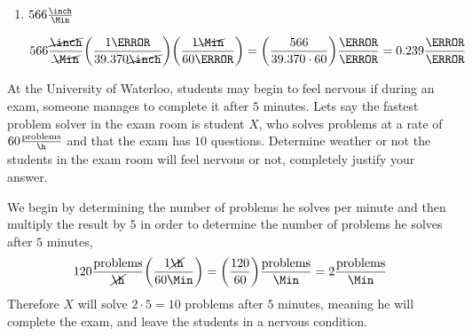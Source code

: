 \documentclass[11pt]{article} %
\begin{document}
\begin{qstn}[1]
\begin{enumerate}
\begin{soln}
 \end{soln}





 \item $566 \frac{\inch}{\Min}$


\begin{soln}
$$ 566 \frac{\cancel{\inch}}{\cancel{\Min}} \left(\frac{1 \m}{39.370 \cancel{\inch}} \right) \left(\frac{1 \cancel{\Min}}{60 \s} \right) = \left(\frac{566}{39.370 \cdot 60} \right) \frac{\m}{\s} = 0.239 \frac{\m}{\s}$$

\end{soln}


 \end{enumerate}
 \end{qstn}


 \begin{qstn}[2]
At the University of Waterloo, students may begin to feel nervous if during an exam, someone manages to complete it after $5$ minutes. Lets say the fastest problem solver in the exam room is student $X$, who solves problems at a rate of $60 \frac{\text{problems}}{\h}$ and that the exam has $10$ questions. Determine weather or not the students in the exam room will feel nervous or not, completely justify your answer.


\begin{soln}
We begin by determining the number of problems he solves per minute and then multiply the result by $5$ in order to determine the number of problems he solves after $5$ minutes,
$$120 \frac{\text{problems}}{\cancel{\h}}\left(\frac{1 \cancel{\h}}{60 \Min} \right) = \left(\frac{120}{60} \right) \frac{\text{problems}}{\Min} = 2 \frac{\text{problems}}{\Min} $$
Therefore $X$ will solve $2 \cdot 5 = 10$ problems after $5$ minutes, meaning he will complete the exam, and leave the students in a nervous condition.

\end{soln}


\end{qstn}
\end{document}
